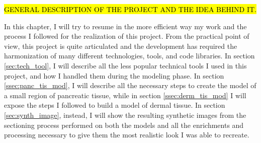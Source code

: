 \hl{GENERAL DESCRIPTION OF THE PROJECT AND THE IDEA BEHIND IT.}

In this chapter, I will try to resume in the more efficient way my work and the process I followed for the realization of this project. From the practical point of view, this project is quite articulated and the development has required the harmonization of many different technologies, tools, and code libraries. In section \ref{sec:tech_tool}, I will describe all the less popular technical tools I used in this project, and how I handled them during the modeling phase. In section \ref{ssec:panc_tis_mod}, I will describe all the necessary steps to create the model of a small region of pancreatic tissue, while in section \ref{ssec:derm_tis_mod} I will expose the steps I followed to build a model of dermal tissue. In section \ref{sec:synth_image}, instead, I will show the resulting synthetic images from the sectioning process performed on both the models and all the enrichments and processing necessary to give them the most realistic look I was able to recreate.
